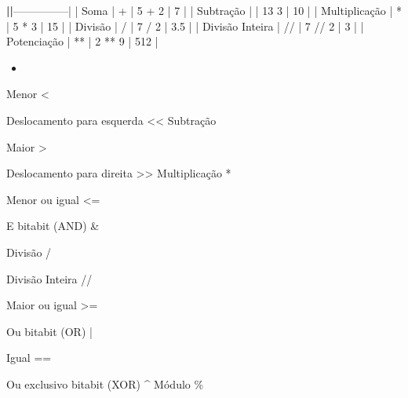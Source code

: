 \documentclass[letterpaper,10pt,brazil]{sphinxmanual}
\begin{document}
{\color{red}\bfseries{}|\sphinxhyphen{}\sphinxhyphen{}\sphinxhyphen{}\sphinxhyphen{}\sphinxhyphen{}\sphinxhyphen{}\sphinxhyphen{}\sphinxhyphen{}\sphinxhyphen{}\sphinxhyphen{}\sphinxhyphen{}\sphinxhyphen{}\sphinxhyphen{}\sphinxhyphen{}\sphinxhyphen{}\sphinxhyphen{}\sphinxhyphen{}|}———\sphinxhyphen{}{\color{red}\bfseries{}|\sphinxhyphen{}\sphinxhyphen{}\sphinxhyphen{}\sphinxhyphen{}\sphinxhyphen{}\sphinxhyphen{}\sphinxhyphen{}\sphinxhyphen{}\sphinxhyphen{}|}——\sphinxhyphen{}|
| Soma            | +        |  5 + 2  |  7    |
|  Subtração      | \sphinxhyphen{}        | 13 \sphinxhyphen{} 3  | 10    |
| Multiplicação   | *        | 5 * 3   | 15    |
| Divisão         | /        | 7 / 2   | 3.5   |
| Divisão Inteira | //       | 7 // 2  | 3     |
| Potenciação     | **       | 2 ** 9  | 512   |

\begin{itemize}
\item {} 
\end{itemize}

Menor
\textless{}

Deslocamento para esquerda
\textless{}\textless{}
Subtração
\sphinxhyphen{}

Maior
\textgreater{}

Deslocamento para direita
\textgreater{}\textgreater{}
Multiplicação
*

Menor ou igual
\textless{}=

E bit\sphinxhyphen{}a\sphinxhyphen{}bit (AND)
\&

Divisão
/

Divisão Inteira
//

\begin{sphinxVerbatim}[commandchars=\\\{\}]
  
  
  
  
\end{sphinxVerbatim}

Maior ou igual
\textgreater{}=

Ou bit\sphinxhyphen{}a\sphinxhyphen{}bit (OR)
|

Igual
==

Ou exclusivo bit\sphinxhyphen{}a\sphinxhyphen{}bit (XOR)
\textasciicircum{}
Módulo
\%
\end{document}
